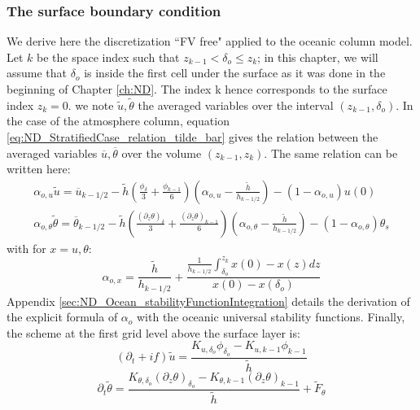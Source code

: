 \subsubsection{The surface boundary condition}
We derive here the discretization ``FV free" applied to the oceanic
column model. Let $k$ be the space index such that
$z_{k-1} < \delta_o \leq z_k$;
in this chapter, we will assume that $\delta_o$ is
inside the first cell under the surface as it was done
in the beginning of Chapter \ref{ch:ND}. The index k hence
corresponds to the surface index $z_k=0$.
we note $\widetilde{u}, \widetilde{\theta}$
the averaged variables over the interval $(z_{k-1}, \delta_o)$.
In the case of the atmosphere column, equation
\eqref{eq:ND_StratifiedCase_relation_tilde_bar}
gives the relation between the averaged variables
$\overline{u}, \overline{\theta}$ over the volume $(z_{k-1}, z_{k})$.
The same relation can be written here:
\begin{equation}
\begin{aligned}
\label{eq:ND_Ocean_relation_tilde_bar}
\alpha_{o, u}\widetilde{u} = \overline{u}_{k-1/2} -
\widetilde{h}
	\left(\frac{\phi_{\delta}}{3} + \frac{\phi_{k-1}}{6}\right)
	\left(\alpha_{o, u} - \frac{\widetilde{h}}{h_{k-1/2}}\right)
	- (1 - \alpha_{o, u})u(0)\\
\alpha_{o, \theta}
\widetilde{\theta}
= \overline{\theta}_{k-1/2} -
	\widetilde{h}\left(\frac{{(\partial_z \theta)}_{\delta}}{3}
	+ \frac{{(\partial_z \theta)}_{k-1}}{6}\right)
	\left(\alpha_{o, \theta}-\frac{\widetilde{h}}{h_{k-1/2}}\right)
 - (1 - \alpha_{o, \theta})\theta_s
\end{aligned}
\end{equation}
with for $x = u, \theta$:
\begin{equation}
	\alpha_{o, x} = \frac{\widetilde{h}}{h_{k-1/2}} +
	\frac{\frac{1}{{h_{k-1/2}}}\int_{\delta_{o}}^{z_k} x(0) - x(z)
	dz}{x(0) - x(\delta_{o})}
\end{equation}
Appendix \ref{sec:ND_Ocean_stabilityFunctionIntegration}
details the derivation of the explicit formula of $\alpha_{o}$
with the oceanic universal stability functions.
Finally, the scheme at the first grid level above
the surface layer is:
\begin{equation}
	\label{eq:ND_Ocean_semiDiscreteEkmanEqFVfree}
	(\partial_t+if) \widetilde{u}
	= \frac{K_{u, \delta_o}\phi_{\delta_o}
	- K_{u,k-1} \phi_{k-1}}{\widetilde{h}}
\end{equation}
\begin{equation}
	\label{eq:ND_Ocean_semiDiscreteEkmanEqPTFVfree}
	\partial_t \widetilde{\theta}
	= \frac{K_{\theta, \delta_o}{(\partial_z \theta)}_{\delta_o} -
	K_{\theta,k-1} {(\partial_z \theta)}_{k-1}}{\widetilde{h}}
	+ \widetilde{F}_\theta 
\end{equation}
